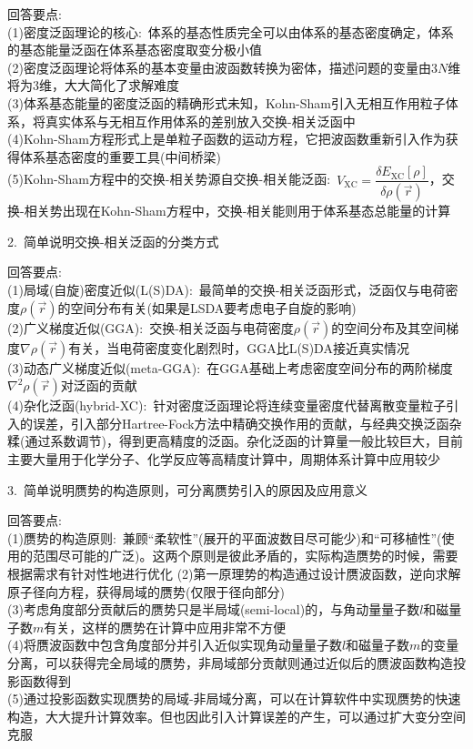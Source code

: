 {\heiti 回答要点:}\\
(1)密度泛函理论的核心:~体系的基态性质完全可以由体系的基态密度确定，体系的基态能量泛函在体系基态密度取变分极小值\\
(2)密度泛函理论将体系的基本变量由波函数转换为密体，描述问题的变量由$3N$维将为$3$维，大大简化了求解难度\\
(3)体系基态能量的密度泛函的精确形式未知，\textrm{Kohn-Sham}引入无相互作用粒子体系，将真实体系与无相互作用体系的差别放入交换-相关泛函中\\
(4)\textrm{Kohn-Sham}方程形式上是单粒子函数的运动方程，它把波函数重新引入作为获得体系基态密度的重要工具(中间桥梁)\\
(5)\textrm{Kohn-Sham}方程中的交换-相关势源自交换-相关能泛函:~$V_{\mathrm{XC}}=\dfrac{\delta E_{\mathrm{XC}}[\rho]}{\delta\rho(\vec r)}$，交换-相关势出现在\textrm{Kohn-Sham}方程中，交换-相关能则用于体系基态总能量的计算

2.~简单说明交换-相关泛函的分类方式

{\heiti 回答要点:}\\
(1)局域(自旋)密度近似\textrm{(L(S)DA)}:~最简单的交换-相关泛函形式，泛函仅与电荷密度$\rho(\vec r)$的空间分布有关(如果是\textrm{LSDA}要考虑电子自旋的影响)\\
(2)广义梯度近似\textrm{(GGA):~}交换-相关泛函与电荷密度$\rho(\vec r)$的空间分布及其空间梯度$\nabla\rho(\vec r)$有关，当电荷密度变化剧烈时，\textrm{GGA}比\textrm{L(S)DA接近真实情况}\\
(3)动态广义梯度近似\textrm{(meta-GGA)}:~在\textrm{GGA}基础上考虑密度空间分布的两阶梯度$\nabla^2\rho(\vec r)$对泛函的贡献\\
(4)杂化泛函\textrm{(hybrid-XC)}:~针对密度泛函理论将连续变量密度代替离散变量粒子引入的误差，引入部分\textrm{Hartree-Fock}方法中精确交换作用的贡献，与经典交换泛函杂糅(通过系数调节)，得到更高精度的泛函。杂化泛函的计算量一般比较巨大，目前主要大量用于化学分子、化学反应等高精度计算中，周期体系计算中应用较少

3.~简单说明赝势的构造原则，可分离赝势引入的原因及应用意义

{\heiti 回答要点:}\\
(1)赝势的构造原则:~兼顾``柔软性''(展开的平面波数目尽可能少)和``可移植性''(使用的范围尽可能的广泛)。这两个原则是彼此矛盾的，实际构造赝势的时候，需要根据需求有针对性地进行优化
(2)第一原理势的构造通过设计赝波函数，逆向求解原子径向方程，获得局域的赝势(仅限于径向部分)\\
(3)考虑角度部分贡献后的赝势只是半局域\textrm{(semi-local)}的，与角动量量子数$l$和磁量子数$m$有关，这样的赝势在计算中应用非常不方便\\
(4)将赝波函数中包含角度部分并引入近似实现角动量量子数$l$和磁量子数$m$的变量分离，可以获得完全局域的赝势，非局域部分贡献则通过近似后的赝波函数构造投影函数得到\\
(5)通过投影函数实现赝势的局域-非局域分离，可以在计算软件中实现赝势的快速构造，大大提升计算效率。但也因此引入计算误差的产生，可以通过扩大变分空间克服

